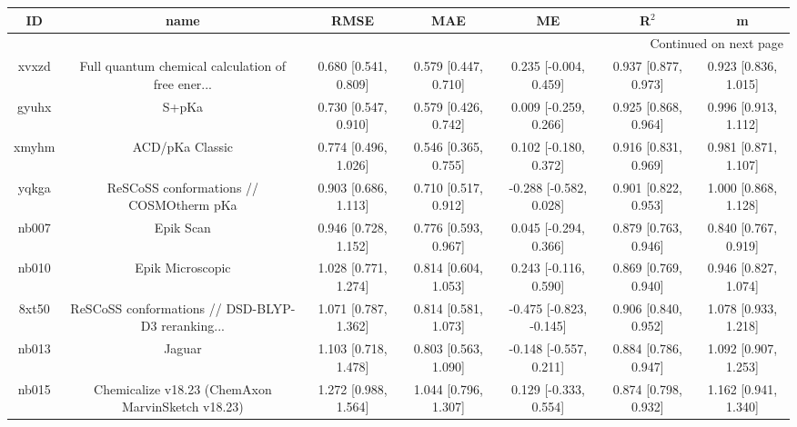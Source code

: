 \documentclass{article}
\begin{document}
\begin{center}
\begin{longtable}{|ccccccc|}
\toprule
    ID &                                               name &                  RMSE &                   MAE &                       ME &                 R$^2$ &                      m \\
\midrule
\endhead
\midrule
\multicolumn{7}{r}{{Continued on next page}} \\
\midrule
\endfoot

\bottomrule
\endlastfoot
 xvxzd &  Full quantum chemical calculation of free ener... &  0.680 [0.541, 0.809] &  0.579 [0.447, 0.710] &    0.235 [-0.004, 0.459] &  0.937 [0.877, 0.973] &   0.923 [0.836, 1.015] \\
 gyuhx &                                              S+pKa &  0.730 [0.547, 0.910] &  0.579 [0.426, 0.742] &    0.009 [-0.259, 0.266] &  0.925 [0.868, 0.964] &   0.996 [0.913, 1.112] \\
 xmyhm &                                    ACD/pKa Classic &  0.774 [0.496, 1.026] &  0.546 [0.365, 0.755] &    0.102 [-0.180, 0.372] &  0.916 [0.831, 0.969] &   0.981 [0.871, 1.107] \\
 yqkga &            ReSCoSS conformations // COSMOtherm pKa &  0.903 [0.686, 1.113] &  0.710 [0.517, 0.912] &   -0.288 [-0.582, 0.028] &  0.901 [0.822, 0.953] &   1.000 [0.868, 1.128] \\
 nb007 &                                          Epik Scan &  0.946 [0.728, 1.152] &  0.776 [0.593, 0.967] &    0.045 [-0.294, 0.366] &  0.879 [0.763, 0.946] &   0.840 [0.767, 0.919] \\
 nb010 &                                   Epik Microscopic &  1.028 [0.771, 1.274] &  0.814 [0.604, 1.053] &    0.243 [-0.116, 0.590] &  0.869 [0.769, 0.940] &   0.946 [0.827, 1.074] \\
 8xt50 &  ReSCoSS conformations // DSD-BLYP-D3 reranking... &  1.071 [0.787, 1.362] &  0.814 [0.581, 1.073] &  -0.475 [-0.823, -0.145] &  0.906 [0.840, 0.952] &   1.078 [0.933, 1.218] \\
 nb013 &                                             Jaguar &  1.103 [0.718, 1.478] &  0.803 [0.563, 1.090] &   -0.148 [-0.557, 0.211] &  0.884 [0.786, 0.947] &   1.092 [0.907, 1.253] \\
 nb015 &  Chemicalize v18.23 (ChemAxon MarvinSketch v18.23) &  1.272 [0.988, 1.564] &  1.044 [0.796, 1.307] &    0.129 [-0.333, 0.554] &  0.874 [0.798, 0.932] &   1.162 [0.941, 1.340] \\

\end{longtable}
\end{center}
\end{document}
